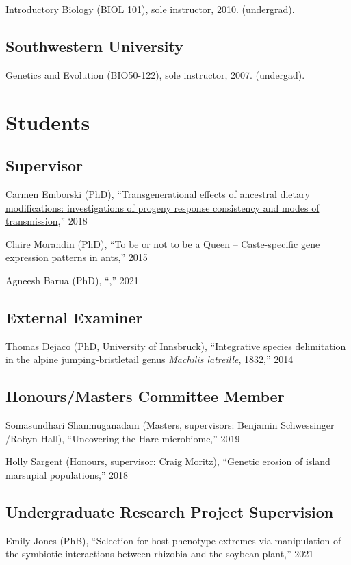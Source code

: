 \documentclass[11pt]{article}
\begin{document}
\ind Introductory Biology (BIOL 101), sole
instructor, 2010. (undergrad).

\subsection{Southwestern University}
\ind Genetics and Evolution (BIO50-122), sole
instructor, 2007. (undergad).


\section{Students}

\subsection{Supervisor}
\ind Carmen
Emborski (PhD), ``\href{https://ttu-ir.tdl.org/bitstream/handle/2346/74394/EMBORSKI-DISSERTATION-2018.pdf}{Transgenerational
effects of ancestral dietary modifications: investigations of progeny
response consistency and modes of transmission},'' 2018

\ind Claire
Morandin (PhD), ``\href{https://pdfs.semanticscholar.org/ce84/0a0475d80c276d36c4e6f6fa7a00d0f3524c.pdf}{To
be or not to be a Queen -- Caste-specific gene expression patterns in
ants},'' 2015

\ind Agneesh Barua (PhD), ``,'' 2021

\subsection{External Examiner}
\ind Thomas Dejaco (PhD, University of Innsbruck), ``Integrative species
delimitation in the alpine jumping‐bristletail genus
\textit{Machilis latreille}, 1832,'' 2014

\subsection{Honours/Masters Committee Member}
\ind Somasundhari Shanmuganadam (Masters, supervisors: Benjamin
Schwessinger /Robyn Hall), ``Uncovering the Hare microbiome,'' 2019

\ind Holly Sargent (Honours, supervisor: Craig Moritz), ``Genetic
erosion of island marsupial populations,'' 2018

\subsection{Undergraduate Research Project Supervision}
\ind Emily Jones (PhB), ``Selection for host phenotype extremes via
manipulation of the symbiotic interactions between rhizobia and the
soybean plant,'' 2021
\end{document}

